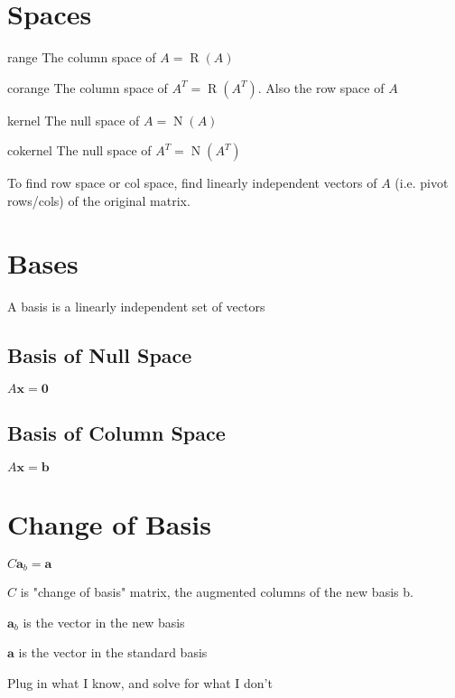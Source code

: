 \documentclass[10pt,letterpaper]{article}
\newenvironment{tight_item}
{\begin{itemize}
\setlength{\parskip}{0pt}
\setlength{\parsep}{0pt}
\setlength{\itemsep}{0pt}
\setlength{\parsep}{0pt}
\setlength{\topsep}{0pt}
\setlength{\partopsep}{0pt}
\setlength{\leftmargin}{0em}
\setlength{\labelwidth}{0em}
\setlength{\labelsep}{0em} }
{\end{itemize}}
\newenvironment{tight_enum}
{\begin{enumerate}
\setlength{\parskip}{0pt}
\setlength{\parsep}{0pt}
\setlength{\itemsep}{0pt}
\setlength{\parsep}{0pt}
\setlength{\topsep}{0pt}
\setlength{\partopsep}{0pt}
\setlength{\leftmargin}{0em}
\setlength{\labelwidth}{0em}
\setlength{\labelsep}{0em} }
{\end{enumerate}}
\newenvironment{tight_desc}
{\begin{description}
\setlength{\parskip}{0pt}
\setlength{\parsep}{0pt}
\setlength{\itemsep}{0pt}
\setlength{\parsep}{0pt}
\setlength{\topsep}{0pt}
\setlength{\partopsep}{0pt}
\setlength{\leftmargin}{0em}
\setlength{\labelwidth}{0em}
\setlength{\labelsep}{1em} }
{\end{description}}
\begin{document}
{\begin{multicols*}{5}
\section{Spaces}
\begin{tight_desc}
\item[range] The column space of $A = \operatorname{R}(A)$
\item[corange] The column space of $A^{T} = \operatorname{R}(A^{T})$. Also the row space of $A$
\item[kernel] The null space of $A = \operatorname{N}(A)$
\item[cokernel] The null space of $A^{T} = \operatorname{N}(A^{T})$
\end{tight_desc}
\begin{tight_enum}
\item To find row space or col space, find linearly independent vectors of $A$ (i.e. pivot rows/cols) of the original matrix.
\end{tight_enum}

\section{Bases}
\begin{tight_item}
\item A basis is a linearly independent set of vectors
\end{tight_item}
\subsection{Basis of Null Space}
\begin{center}
$A\textbf{x} = \textbf{0}$
\end{center}
\subsection{Basis of Column Space}
\begin{center}
$A\textbf{x} = \textbf{b}$
\end{center}

\section{Change of Basis}
\begin{center}
$C \textbf{a}_{b} = \textbf{a}$
\end{center}
\begin{tight_item}
\item $C$ is "change of basis" matrix, the augmented columns of the new basis b.
\item $\textbf{a}_{b}$ is the vector in the new basis
\item $\textbf{a}$ is the vector in the standard basis
\end{tight_item}
\begin{tight_enum}
\item Plug in what I know, and solve for what I don't
\end{tight_enum}


\end{multicols*}}
\end{document}
